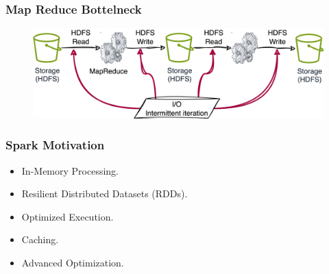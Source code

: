 \begin{frame}
    \frametitle{Map Reduce Bottelneck}
    \begin{figure}
        \includegraphics[width=.96\textwidth,height=.6\textheight]{./Figures/chapter-04/MR}\label{fig:figure4}
    \end{figure}
\end{frame}
\begin{frame}
    \frametitle{Spark Motivation}
    \begin{itemize}

        \item In-Memory Processing.

        \item Resilient Distributed Datasets (RDDs).%

        \item Optimized Execution.%

        \item Caching.%

        \item Advanced Optimization.%

    \end{itemize}
\end{frame}

